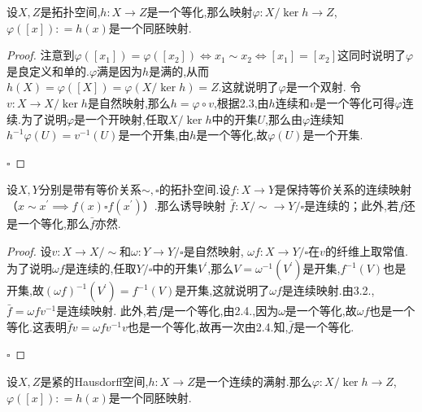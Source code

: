 \documentclass[../../几何与拓扑.tex]{subfiles}
\begin{document}
\begin{theorem}
    设$X,Z$是拓扑空间,$h:X\to Z$是一个等化,那么映射$\varphi: X/\ker h\to Z$,$\varphi \left( [x] \right): = h\left( x \right)$是一个同胚映射.
\end{theorem}

\begin{proof}
    注意到$\varphi \left( [x_{1}] \right)=\varphi \left( [x_{2}] \right)\iff x_{1} \sim x_{2} \iff [x_{1}]=[x_{2}]$这同时说明了$\varphi$是良定义和单的.$\varphi$满是因为$h$是满的,从而$h\left( X \right)= \varphi \left( [X] \right)=\varphi \left( X/  \ker h \right)=Z$.这就说明了$\varphi$是一个双射.
令$v:X\to X /\ker h$是自然映射,那么$h = \varphi \circ v$,根据2.3,由$h$连续和$v$是一个等化可得$\varphi$连续.为了说明$\varphi$是一个开映射,任取$X/ \ker h$中的开集$U$,那么由$\varphi$连续知$h^{-1}\varphi \left( U \right)= v^{-1}\left( U \right)$是一个开集,由$h$是一个等化,故$\varphi \left( U \right)$是一个开集.


    \hfill $\square$
\end{proof}

\begin{theorem}
    设$X,Y$分别是带有等价关系$\sim,\square$的拓扑空间.设$f:X\to Y$是保持等价关系的连续映射（$x \sim x^{\prime}\implies f\left( x \right)\square f\left( x^{\prime} \right)$）.那么诱导映射 $\bar{f}: X/\sim \to Y / \square$是连续的；此外,若$f$还是一个等化,那么$\bar{f}$亦然.

\end{theorem}

\begin{proof}
    设$v:X \to X / \sim$和$\omega: Y\to Y / \square$是自然映射,
$\omega f: X \to Y/ \square$在$v$的纤维上取常值.为了说明$\omega f$是连续的,任取$Y/ \square$中的开集$V^{\prime}$,那么$V= \omega^{-1}\left( V^{\prime} \right)$是开集,$f^{-1}\left( V \right)$也是开集,故$\left( \omega f \right)^{-1}\left( V^{\prime} \right)=f^{-1}\left( V \right)$是开集,这就说明了$\omega f$是连续映射.由3.2.,$\bar{f}=\omega fv^{-1}$是连续映射.
此外,若$f$是一个等化,由2.4.,因为$\omega$是一个等化,故$\omega f$也是一个等化.这表明$\bar{f}v=\omega fv^{-1}v$也是一个等化,故再一次由2.4.知,$\bar{f}$是一个等化.

    \hfill $\square$
\end{proof}

\begin{theorem}
    设$X,Z$是紧的Hausdorff空间,$h:X\to Z$是一个连续的满射.那么$\varphi:X/\ker h \to Z$,$\varphi \left( [x] \right): = h\left( x \right)$是一个同胚映射.
\end{theorem}
\end{document}
